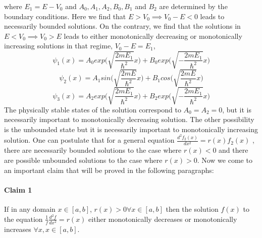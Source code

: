 \documentclass{article}
\begin{document}
where $E_1 = E-V_0$ and $A_0, A_1, A_2, B_0, B_1$ and $B_2$ are determined by the boundary conditions. Here we find that $E > V_0 \implies V_0 - E < 0$ leads to necessarily bounded solutions. On the contrary, we find that the solutions in $E < V_0 \implies V_0 > E$ leads to either monotonically decreasing or monotonically increasing solutions in that regime, $V_0 - E = E_1$,
\begin{equation*}
\psi_1(x) = A_0 exp\bigg(\sqrt{\frac{2 m E_1}{\hbar^2}} x\bigg) + B_0 exp\bigg(\sqrt{-\frac{2 m E_1}{\hbar^2}} x\bigg)
\end{equation*}
\begin{equation*}
\psi_2(x) = A_1 sin\bigg(\sqrt{\frac{2 m E}{\hbar^2}} x\bigg) + B_1 cos\bigg(\sqrt{\frac{2 m E}{\hbar^2}} x\bigg)
\end{equation*}
\begin{equation*}
\psi_3(x) = A_2 exp\bigg(\sqrt{\frac{2 m E_1}{\hbar^2}} x\bigg) + B_2 exp\bigg(\sqrt{-\frac{2 m E_1}{\hbar^2}} x\bigg)
\end{equation*}
The physically stable states of the solution correspond to $A_0 = A_2 = 0$, but it is necessarily important to monotonically decreasing solution. The other possibility is the unbounded state but it is necessarily important to monotonically increasing solution. One can postulate that for a general equation $\frac{d^2 f_2(x)}{d x^2} = r(x) f_2(x)$ , there are necessarily bounded solutions to the case where $r(x) < 0$ and there are possible unbounded solutions to the case where $r(x) > 0$. Now we come to an important claim that will be proved in the following paragraphs:
\paragraph{Claim 1} If in any domain $x \in [a,b]$, $r(x) > 0 \forall x \in [a,b]$ then the solution $f(x)$ to the equation $\frac{1}{f} \frac{d^2 f}{d x^2} = r(x)$ either monotonically decreases or monotonically increases $\forall x, x \in [a,b]$.
\end{document}
